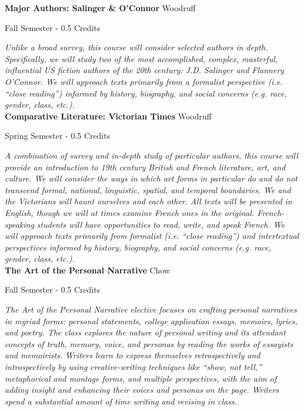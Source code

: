 \noindent\textbf{Major Authors: Salinger \& O'Connor} \hfill Woodruff

\noindent Fall Semester - 0.5 Credits

\vspace{1mm}\emph{Unlike a broad survey, this course will consider selected authors in depth. Specifically, we will study two of the most accomplished, complex, masterful, influential US fiction authors of the 20th century: J.D. Salinger and Flannery O’Connor. We will approach texts primarily from a formalist perspective (i.e. ``close reading'') informed by history, biography, and social concerns (e.g. race, gender, class, etc.).}\\

\noindent\textbf{Comparative Literature: Victorian Times} \hfill Woodruff

\noindent Spring Semester - 0.5 Credits

\vspace{1mm}\emph{A combination of survey and in-depth study of particular authors, this course will provide an introduction to 19th century British and French literature, art, and culture. We will consider the ways in which art forms in particular do and do not transcend formal, national, linguistic, spatial, and temporal boundaries. We and the Victorians will haunt ourselves and each other. All texts will be presented in English, though we will at times examine French ones in the original. French-speaking students will have opportunities to read, write, and speak French. We will approach texts primarily from formalist (i.e. ``close reading'') and intertextual perspectives informed by history, biography, and social concerns (e.g. race, gender, class, etc.).}\\

\noindent\textbf{The Art of the Personal Narrative} \hfill Chow

\noindent Fall Semester - 0.5 Credits

\vspace{1mm}\emph{The Art of the Personal Narrative elective focuses on crafting personal narratives in myriad forms: personal statements, college application essays, memoirs, lyrics, and poetry. The class explores the nature of personal writing and its attendant concepts of truth, memory, voice, and personas by reading the works of essayists and memoirists. Writers learn to express themselves retrospectively and introspectively by using creative-writing techniques like ``show, not tell,'' metaphorical and montage forms, and multiple perspectives, with the aim of adding insight and enhancing their voices and personas on the page. Writers spend a substantial amount of time writing and revising in class.}\\

